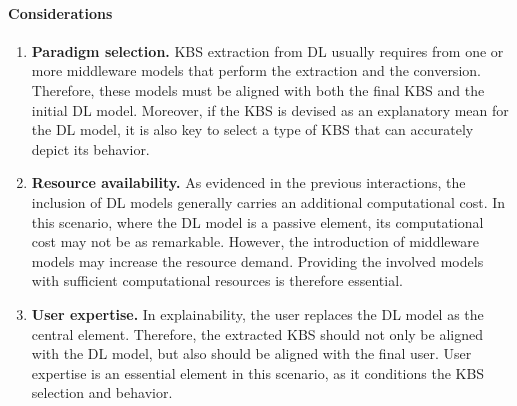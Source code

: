 \paragraph{Considerations}
\begin{enumerate} [start=1,label={\bfseries C\arabic*.}]
    \item \textbf{Paradigm selection.} \label{kbsextradl_C_paradigm} KBS extraction from DL usually requires from one or more middleware models that perform the extraction and the conversion. Therefore, these models must be aligned with both the final KBS and the initial DL model. Moreover, if the KBS is devised as an explanatory mean for the DL model, it is also key to select a type of KBS that can accurately depict its behavior.
    
    \item \textbf{Resource availability.} \label{kbsextradl_C_resource} As evidenced in the previous interactions, the inclusion of DL models generally carries an additional computational cost. In this scenario, where the DL model is a passive element, its computational cost may not be as remarkable. However, the introduction of middleware models may increase the resource demand. Providing the involved models with sufficient computational resources is therefore essential.
    
    \item \textbf{User expertise.} \label{kbsextradl_C_user} In explainability, the user replaces the DL model as the central element. Therefore, the extracted KBS should not only be aligned with the DL model, but also should be aligned with the final user. User expertise is an essential element in this scenario, as it conditions the KBS selection and behavior.
\end{enumerate}

